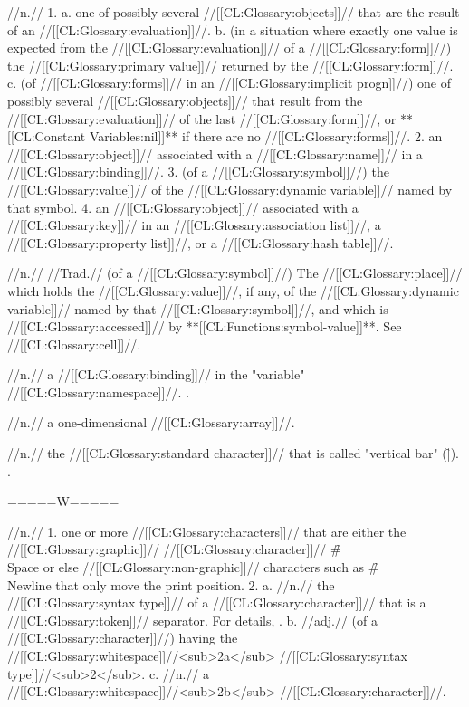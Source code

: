  //n.// 1. a. one of possibly several //[[CL:Glossary:objects]]// that are the result of an //[[CL:Glossary:evaluation]]//. b. (in a situation where exactly one value is expected from the //[[CL:Glossary:evaluation]]// of a //[[CL:Glossary:form]]//) the //[[CL:Glossary:primary value]]// returned by the //[[CL:Glossary:form]]//. c. (of //[[CL:Glossary:forms]]// in an //[[CL:Glossary:implicit progn]]//) one of possibly several //[[CL:Glossary:objects]]// that result from the //[[CL:Glossary:evaluation]]// of the last //[[CL:Glossary:form]]//, or **[[CL:Constant Variables:nil]]** if there are no //[[CL:Glossary:forms]]//. 2. an //[[CL:Glossary:object]]// associated with a //[[CL:Glossary:name]]// in a //[[CL:Glossary:binding]]//. 3. (of a //[[CL:Glossary:symbol]]//) the //[[CL:Glossary:value]]// of the //[[CL:Glossary:dynamic variable]]// named by that symbol. 4. an //[[CL:Glossary:object]]// associated with a //[[CL:Glossary:key]]// in an //[[CL:Glossary:association list]]//, a //[[CL:Glossary:property list]]//, or a //[[CL:Glossary:hash table]]//.

 //n.// //Trad.// (of a //[[CL:Glossary:symbol]]//) The //[[CL:Glossary:place]]// which holds the //[[CL:Glossary:value]]//, if any, of the //[[CL:Glossary:dynamic variable]]// named by that //[[CL:Glossary:symbol]]//, and which is //[[CL:Glossary:accessed]]// by **[[CL:Functions:symbol-value]]**. See //[[CL:Glossary:cell]]//.

 //n.// a //[[CL:Glossary:binding]]// in the "variable" //[[CL:Glossary:namespace]]//. \Seesection\SymbolsAsForms.
 
 //n.// a one-dimensional //[[CL:Glossary:array]]//.

 //n.// the //[[CL:Glossary:standard character]]// that is called "vertical bar" (\f{|}). \Seefigure\StdCharsThree.

=====W=====
 
 //n.// 1. one or more //[[CL:Glossary:characters]]// that are either the //[[CL:Glossary:graphic]]// //[[CL:Glossary:character]]// \f{\#\\Space} or else //[[CL:Glossary:non-graphic]]// characters such as \f{\#\\Newline} that only move the print position. 2. a. //n.// the //[[CL:Glossary:syntax type]]// of a //[[CL:Glossary:character]]// that is a //[[CL:Glossary:token]]// separator. For details, \seesection\WhitespaceChars. b. //adj.// (of a //[[CL:Glossary:character]]//) having the //[[CL:Glossary:whitespace]]//<sub>2a</sub> //[[CL:Glossary:syntax type]]//<sub>2</sub>. c. //n.// a //[[CL:Glossary:whitespace]]//<sub>2b</sub> //[[CL:Glossary:character]]//.

